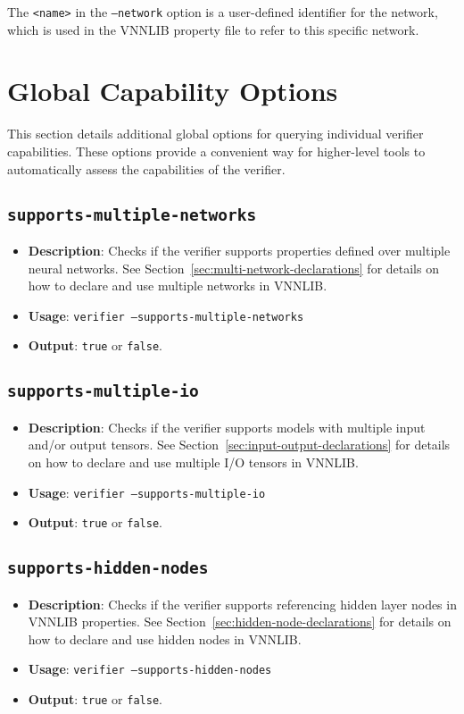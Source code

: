 The \texttt{<name>} in the \texttt{--network} option is a user-defined identifier for the network, which is used in the VNNLIB property file to refer to this specific network.

\section{Global Capability Options}

This section details additional global options for querying individual verifier capabilities. These options provide a convenient way for higher-level tools to automatically assess the capabilities of the verifier.

\subsection{\texttt{supports-multiple-networks}}
\begin{itemize}
    \item \textbf{Description}: Checks if the verifier supports properties defined over multiple neural networks. See Section~\ref{sec:multi-network-declarations} for details on how to declare and use multiple networks in VNNLIB.
    \item \textbf{Usage}: \texttt{verifier --supports-multiple-networks}
    \item \textbf{Output}: \texttt{true} or \texttt{false}.
\end{itemize}

\subsection{\texttt{supports-multiple-io}}
\begin{itemize}
    \item \textbf{Description}: Checks if the verifier supports models with multiple input and/or output tensors. See Section~\ref{sec:input-output-declarations} for details on how to declare and use multiple I/O tensors in VNNLIB.
    \item \textbf{Usage}: \texttt{verifier --supports-multiple-io}
    \item \textbf{Output}: \texttt{true} or \texttt{false}.
\end{itemize}

\subsection{\texttt{supports-hidden-nodes}}
\begin{itemize}
    \item \textbf{Description}: Checks if the verifier supports referencing hidden layer nodes in VNNLIB properties. See Section~\ref{sec:hidden-node-declarations} for details on how to declare and use hidden nodes in VNNLIB.
    \item \textbf{Usage}: \texttt{verifier --supports-hidden-nodes}
    \item \textbf{Output}: \texttt{true} or \texttt{false}.
\end{itemize}

